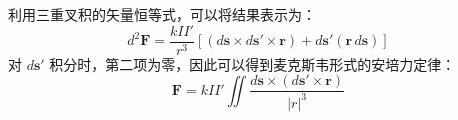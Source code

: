 利用三重叉积的矢量恒等式，可以将结果表示为：
\[
d^{2}\mathbf{F} = \frac{kII'}{r^{3}}\left[\left(d\mathbf{s} \times d\mathbf{s'} \times \mathbf{r}\right) + d\mathbf{s'}(\mathbf{r} \, d\mathbf{s})\right]~
\]
对 \(d\mathbf{s'}\) 积分时，第二项为零，因此可以得到麦克斯韦形式的安培力定律：
\[
\mathbf{F} = kII'\iint \frac{d\mathbf{s} \times (d\mathbf{s'} \times \mathbf{r})}{|r|^{3}}~
\]
